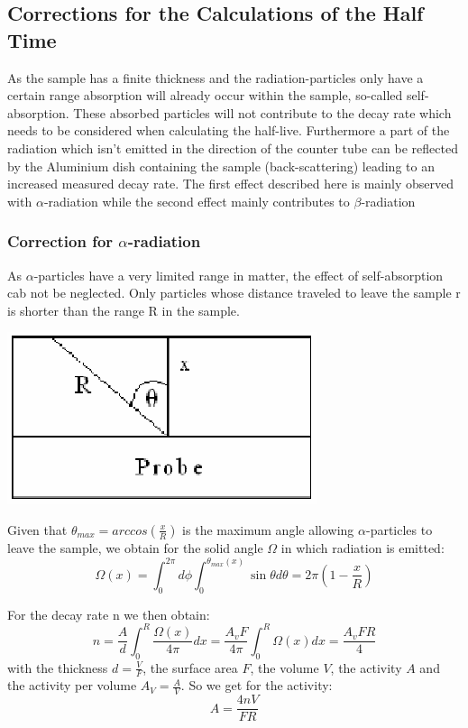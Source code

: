 \documentclass[12pt]{article}
\begin{document}
 \subsection{Corrections for the Calculations of the Half Time}
 
 As the sample has a finite thickness and the radiation-particles only have a certain range absorption will already occur within the sample, so-called self-absorption. These absorbed particles will not contribute to the decay rate which needs to be considered when calculating the half-live. Furthermore a part of the radiation which isn't emitted in the direction of the counter tube can be reflected by the Aluminium dish containing the sample (back-scattering) leading to an increased measured decay rate.
The first effect described here is mainly observed with $\alpha$-radiation while the second effect mainly contributes to $\beta$-radiation


\subsubsection{Correction for $\alpha$-radiation}

As $\alpha$-particles have a very limited range in matter, the effect of self-absorption cab not be neglected. Only particles whose distance traveled to leave the sample r is shorter than the range R in the sample. 

%
\vskip0.5cm
\begin{minipage}{\textwidth}
	\centering
	\includegraphics[width=.3\textwidth]{figures/alpha-Korrektur.png}
\end{minipage}
\vskip0.5cm
Given that $\theta_{max}=arccos\left( \frac{x}{R}\right)$   is the maximum angle allowing $\alpha$-particles to leave the sample, we obtain for the 
solid angle $\Omega$ in which radiation is emitted:
\[\Omega(x)=\int_{0}^{2\pi}d\phi\int_{0}^{\theta_{max}(x)}\sin\theta d\theta = 2\pi\left( 1-\frac{x}{R}\right)\]

For the decay rate n we then obtain:
\[n= \frac{A}{d}\int_{0}^{R}\frac{\Omega(x)}{4\pi}dx = \frac{A_v F}{4\pi}\int_{0}^{R}\Omega(x)dx = \frac{A_v F R}{4}\]
with the thickness $d=\frac{V}{F}$, the surface area $F$, the volume $V$, the activity $A$ and the activity per volume $A_V=\frac{A}{V}$. So we get for the activity:
$$A=\frac{4nV}{FR}$$
\end{document}
